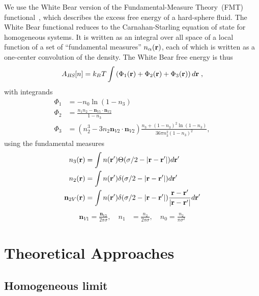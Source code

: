 We use the White Bear version of the Fundamental-Measure Theory~(FMT)
functional~\cite{roth2002whitebear}, which describes the excess free
energy of a hard-sphere fluid.  The White Bear functional reduces to
the Carnahan-Starling equation of state for homogeneous systems.  It
is written as an integral over all space of a local function of a set
of ``fundamental measures'' $n_\alpha(\textbf{r})$, each of which is written
as a one-center convolution of the density.  The White Bear free
energy is thus
\begin{equation}
A_\textit{HS}[n] = k_B T \int \left(\Phi_1(\textbf{r}) + \Phi_2(\textbf{r}) + \Phi_3(\textbf{r})\right) d\textbf{r} \; ,
\end{equation}
with integrands
\begin{align}
\Phi_1 &= -n_0 \ln\left( 1 - n_3\right) \label{eq:Phi1}\\
\Phi_2 &= \frac{n_1 n_2 - \mathbf{n}_{V1} \cdot\mathbf{n}_{V2}}{1-n_3} \\
\Phi_3 &= (n_2^3 - 3 n_2 \mathbf{n}_{V2} \cdot \mathbf{n}_{V2}) \frac{
  n_3 + (1-n_3)^2 \ln(1-n_3)
}{
  36\pi n_3^2\left( 1 - n_3 \right)^2
} , \label{eq:Phi3}
\end{align}
using the fundamental measures
\begin{align}
  n_3(\textbf{r}) &= \int n(\textbf{r}') \Theta(\sigma/2 -\left|\textbf{r} - \textbf{r}'\right|)
  d\textbf{r}' \label{eq:FMn3} \\
  n_2(\textbf{r}) &= \int n(\textbf{r}') \delta(\sigma/2 -\left|\textbf{r} - \textbf{r}'\right|) d\textbf{r}' \\
  \mathbf{n}_{2V}(\textbf{r}) &= \int n(\textbf{r}') \delta(\sigma/2 -\left|\textbf{r} - \textbf{r}'\right|) \frac{\textbf{r}-\textbf{r}'}{|\textbf{r}-\textbf{r}'|}d\textbf{r}'
\end{align}
\begin{align}
  \mathbf{n}_{V1} = \frac{\mathbf{n}_{V2}}{2\pi \sigma}, \quad
  n_1 &= \frac{n_2}{2\pi \sigma} , \quad
  n_0 = \frac{n_2}{\pi \sigma^2} \label{eq:FMrest}
\end{align}

\section{Theoretical Approaches}

\subsection{Homogeneous limit}

